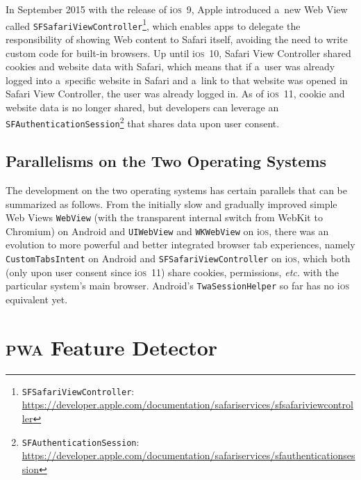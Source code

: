 \documentclass[sigconf]{acmart}
\begin{document}
In September 2015 with the release of i\textsc{os}~9, Apple introduced a~new Web View called
\texttt{SFSafariViewController}\footnote{\texttt{SFSafariViewController}:
\url{https://developer.apple.com/documentation/safariservices/sfsafariviewcontroller}},
which enables apps to delegate the responsibility of showing Web content to Safari itself,
avoiding the need to write custom code for built-in browsers.
Up until i\textsc{os}~10, Safari View Controller shared cookies and website data with Safari,
which means that if a~user was already logged into a~specific website in Safari
and a~link to that website was opened in Safari View Controller,
the user was already logged in.
As of i\textsc{os}~11, cookie and website data is no longer shared,
but developers can leverage
an \texttt{SFAuthenticationSession}\footnote{\texttt{SFAuthenticationSession}:
\url{https://developer.apple.com/documentation/safariservices/sfauthenticationsession}}
that shares data upon user consent. 

\subsection{Parallelisms on the Two Operating Systems}

The development on the two operating systems has certain parallels
that can be summarized as follows.
From the initially slow and gradually improved simple Web Views \texttt{WebView}
(with the transparent internal switch from WebKit to Chromium)
on Android and \texttt{UIWebView} and \texttt{WKWebView} on i\textsc{os},
there was an evolution to more powerful and better integrated browser tab experiences,
namely \texttt{CustomTabsIntent} on Android and
\texttt{SFSafariViewController} on i\textsc{os},
which both (only upon user consent since i\textsc{os}~11)
share cookies, permissions, \emph{etc.}
with the particular system's main browser.
Android's \texttt{TwaSessionHelper} so far has no i\textsc{os} equivalent yet.

\section{\textsc{pwa} Feature Detector}
\label{sec:pwa-feature-detector}
\end{document}
